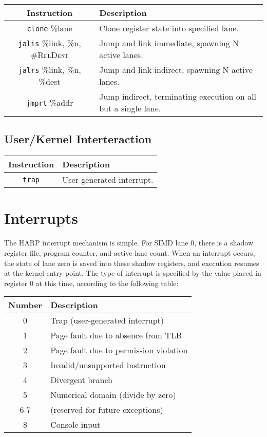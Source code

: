 \documentclass[10pt,letterpaper]{article}
\begin{document}
\begin{center}
\begin{tabular}{cl}
\textbf{Instruction}&\textbf{Description}\\
\hline
\texttt{clone} \%lane&Clone register state into specified lane.\\
\texttt{jalis} \%link, \%n, \textsc{\#RelDest}&Jump and link immediate, spawning N active lanes.\\
\texttt{jalrs} \%link, \%n, \%dest&Jump and link indirect, spawning N active lanes.\\
\texttt{jmprt} \%addr&Jump indirect, terminating execution on all but a single lane.\\
\end{tabular}
\end{center}

\subsection{User/Kernel Interteraction}

\begin{center}
\begin{tabular}{cl}
\textbf{Instruction}&\textbf{Description}\\
\hline
\texttt{trap}&User-generated interrupt.\\
\end{tabular}
\end{center}

\section{Interrupts}
The HARP interrupt mechanism is simple.
For SIMD lane 0, there is a shadow register file, program counter, and active lane count.
When an interrupt occurs, the state of lane zero is saved into these shadow registers, and execution resumes at the kernel entry point.
The type of interrupt is specified by the value placed in register 0 at this time, according to the following table:

\begin{center}
\begin{tabular}{cl}
\textbf{Number}&\textbf{Description}\\
\hline
0    &Trap (user-generated interrupt)\\
1    &Page fault due to absence from TLB\\
2    &Page fault due to permission violation\\
3    &Invalid/unsupported instruction\\
4    &Divergent branch\\
5    &Numerical domain (divide by zero)\\
6-7&(reserved for future exceptions)\\
8    &Console input\\
\end{tabular}
\end{center}
\end{document}
